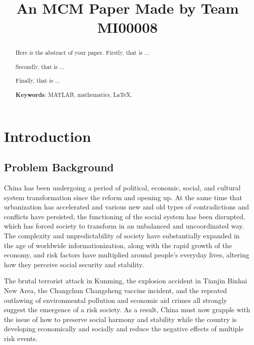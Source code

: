 \documentclass[12pt]{article}  %
\title{An MCM Paper Made by Team MI00008}  %
\begin{document}
\begin{abstract}
    Here is the abstract of your paper.
    Firstly, that is ...

    Secondly, that is ...

    Finally, that is ...

    \vspace{5pt}
    \textbf{Keywords}: MATLAB, mathematics, LaTeX.

\end{abstract}

\maketitle  %
\tableofcontents  %


\section{Introduction}
\subsection{Problem Background}
China has been undergoing a period of political, economic, social, and cultural system transformation since the reform and opening up. At the same time that urbanization has accelerated and various new and old types of contradictions and conflicts have persisted, the functioning of the social system has been disrupted, which has forced society to transform in an unbalanced and uncoordinated way. The complexity and unpredictability of society have substantially expanded in the age of worldwide informationization, along with the rapid growth of the economy, and risk factors have multiplied around people's everyday lives, altering how they perceive social security and stability. 

The brutal terrorist attack in Kunming, the explosion accident in Tianjin Binhai New Area, the Changchun Changsheng vaccine incident, and the repeated outlawing of environmental pollution and economic aid crimes all strongly suggest the emergence of a risk society. As a result, China must now grapple with the issue of how to preserve social harmony and stability while the country is developing economically and socially and reduce the negative effects of multiple risk events.
\end{document}
